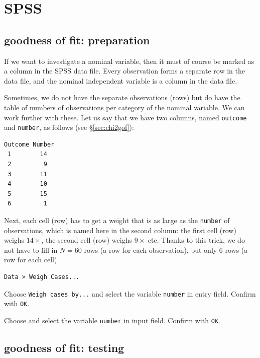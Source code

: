 \documentclass[
]{book}
\begin{document}
\hypertarget{spss-14}{%
\section{SPSS}\label{spss-14}}

\hypertarget{goodness-of-fit-preparation}{%
\subsection{goodness of fit: preparation}\label{goodness-of-fit-preparation}}

If we want to investigate a nominal variable, then it must of course
be marked as a column in the SPSS data file. Every observation
forms a separate row in the data file, and the nominal independent
variable is a column in the data file.

Sometimes, we do not have the separate observations (rows) but
do have the table of numbers of observations per category of the nominal
variable. We can work further with these. Let us say that we have two columns,
named \texttt{outcome} and \texttt{number}, as follows
(see §\ref{sec:chi2gof}):

\begin{verbatim}
Outcome Number
 1        14
 2         9
 3        11
 4        10
 5        15
 6         1
\end{verbatim}

Next, each cell (row) has to get a weight that is as large as the
\texttt{number} of observations, which is named here in the second column: the
first cell (row) weighs \(14\times\), the second cell (row) weighs
\(9\times\) etc. Thanks to this trick, we do not have to fill in \(N=60\) rows
(a row for each observation), but only 6 rows (a row for each cell).

\begin{verbatim}
Data > Weigh Cases... 
\end{verbatim}

Choose \texttt{Weigh\ cases\ by...} and select the variable \texttt{number} in
entry field. Confirm with \texttt{OK}.

Choose and select the variable \texttt{number} in
input field. Confirm with \texttt{OK}.

\hypertarget{goodness-of-fit-testing}{%
\subsection{goodness of fit: testing}\label{goodness-of-fit-testing}}
\end{document}
